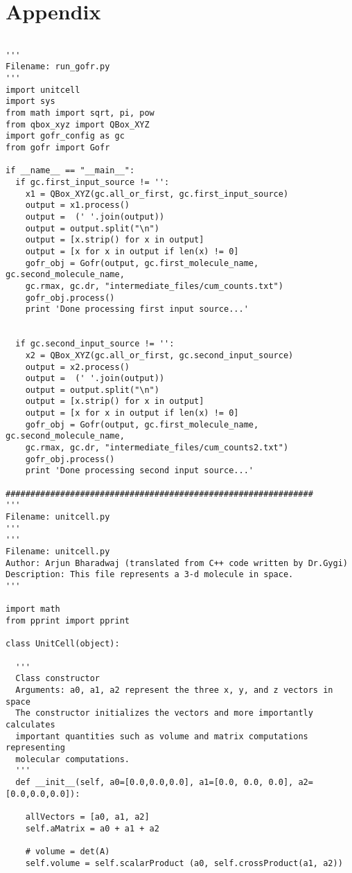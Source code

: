 \section*{Appendix}

\begin{verbatim}

'''
Filename: run_gofr.py
'''
import unitcell
import sys
from math import sqrt, pi, pow
from qbox_xyz import QBox_XYZ
import gofr_config as gc
from gofr import Gofr

if __name__ == "__main__":
  if gc.first_input_source != '':
    x1 = QBox_XYZ(gc.all_or_first, gc.first_input_source)
    output = x1.process()
    output =  (' '.join(output))
    output = output.split("\n")
    output = [x.strip() for x in output]
    output = [x for x in output if len(x) != 0]
    gofr_obj = Gofr(output, gc.first_molecule_name, gc.second_molecule_name, 
    gc.rmax, gc.dr, "intermediate_files/cum_counts.txt")
    gofr_obj.process()
    print 'Done processing first input source...'
  
  
  if gc.second_input_source != '':
    x2 = QBox_XYZ(gc.all_or_first, gc.second_input_source)
    output = x2.process()
    output =  (' '.join(output))
    output = output.split("\n")
    output = [x.strip() for x in output]
    output = [x for x in output if len(x) != 0]
    gofr_obj = Gofr(output, gc.first_molecule_name, gc.second_molecule_name, 
    gc.rmax, gc.dr, "intermediate_files/cum_counts2.txt")
    gofr_obj.process()
    print 'Done processing second input source...'

##############################################################
'''
Filename: unitcell.py
'''
'''
Filename: unitcell.py
Author: Arjun Bharadwaj (translated from C++ code written by Dr.Gygi)
Description: This file represents a 3-d molecule in space.
'''

import math
from pprint import pprint

class UnitCell(object):

  '''
  Class constructor
  Arguments: a0, a1, a2 represent the three x, y, and z vectors in space
  The constructor initializes the vectors and more importantly calculates 
  important quantities such as volume and matrix computations representing
  molecular computations.
  ''' 
  def __init__(self, a0=[0.0,0.0,0.0], a1=[0.0, 0.0, 0.0], a2=[0.0,0.0,0.0]):
    
    allVectors = [a0, a1, a2]
    self.aMatrix = a0 + a1 + a2
    
    # volume = det(A)
    self.volume = self.scalarProduct (a0, self.crossProduct(a1, a2))
    

\end{verbatim}

